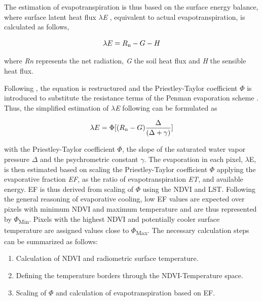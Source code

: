 \documentclass[12pt]{article}
\begin{document}
The estimation of evapotranspiration is thus based on the surface energy balance, where surface latent heat flux \textit{$\lambda$E} , equivalent to actual evapotranspiration, is calculated as follows,

\begin{equation}
\label{eq:en.bal}
\lambda E = R\textsubscript{n} - G - H 
\end{equation}

where \textit{Rn} represents the net radiation, \textit{G} the soil heat flux and \textit{H} the sensible heat flux.

Following \citet{Priestleyetal1972}, the equation is restructured and the Priestley-Taylor coefficient $\Phi$ is introduced to substitute the resistance terms of the Penman evaporation scheme \citep{Penman1956}. Thus, the simplified estimation of \textit{$\lambda$E} following \citet{Priestleyetal1972} can be formulated as

\begin{equation}
\label{eq:phi}
\lambda E = \Phi [(R\textsubscript{n} - G) \frac{\Delta}{(\Delta + \gamma)}]
\end{equation}

with the Priestley-Taylor coefficient \textit{$\Phi$}, the slope of the saturated water vapor pressure \textit{$\Delta$} and the psychrometric constant \textit{$\gamma$}.
The evaporation in each pixel, $\lambda$E, is then estimated based on scaling the Priestley-Taylor coefficient \textit{$\Phi$} applying the evaporative fraction \textit{EF}, as the ratio of evapotranspiration \textit{ET}, and available energy. 
EF is thus derived from scaling of $\Phi$ using the NDVI and LST. Following the general reasoning of evaporative cooling, low EF values are expected over pixels with minimum NDVI and maximum temperature and are thus represented by $\Phi$\textsubscript{Min}. Pixels with the highest NDVI and potentially cooler surface temperature are assigned values close to $\Phi$\textsubscript{Max}. The necessary calculation steps can be summarized as follows:

\begin{enumerate}
\item Calculation of NDVI and radiometric surface temperature.
\item Defining the temperature borders through the NDVI-Temperature space.
\item Scaling of $\Phi$ and calculation of evapotranspiration based on EF.
\end{enumerate}
\end{document}
